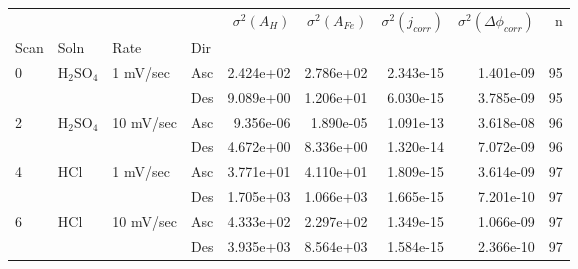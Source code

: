 \begin{tabular}{llllrrrrr}
\toprule
  &     &           &     &  $\sigma^2(A_H)$ &  $\sigma^2(A_{Fe})$ &  $\sigma^2(j_{corr})$ &  $\sigma^2(\Delta \phi_{corr})$ &   n \\
Scan & Soln & Rate & Dir &                  &                     &                       &                                 &     \\
\midrule
0 & H$_2$SO$_4$ & 1 mV/sec & Asc &        2.424e+02 &           2.786e+02 &             2.343e-15 &                       1.401e-09 &  95 \\
  &     &           & Des &        9.089e+00 &           1.206e+01 &             6.030e-15 &                       3.785e-09 &  95 \\
2 & H$_2$SO$_4$ & 10 mV/sec & Asc &        9.356e-06 &           1.890e-05 &             1.091e-13 &                       3.618e-08 &  96 \\
  &     &           & Des &        4.672e+00 &           8.336e+00 &             1.320e-14 &                       7.072e-09 &  96 \\
4 & HCl & 1 mV/sec & Asc &        3.771e+01 &           4.110e+01 &             1.809e-15 &                       3.614e-09 &  97 \\
  &     &           & Des &        1.705e+03 &           1.066e+03 &             1.665e-15 &                       7.201e-10 &  97 \\
6 & HCl & 10 mV/sec & Asc &        4.333e+02 &           2.297e+02 &             1.349e-15 &                       1.066e-09 &  97 \\
  &     &           & Des &        3.935e+03 &           8.564e+03 &             1.584e-15 &                       2.366e-10 &  97 \\
\bottomrule
\end{tabular}
